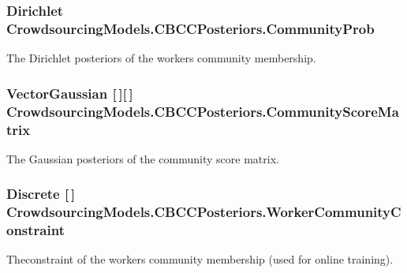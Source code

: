 \subsubsection[{Community\+Prob}]{\setlength{\rightskip}{0pt plus 5cm}Dirichlet Crowdsourcing\+Models.\+C\+B\+C\+C\+Posteriors.\+Community\+Prob}\label{class_crowdsourcing_models_1_1_c_b_c_c_posteriors_a5133c813b46dc47a1eca94f718c01560}


The Dirichlet posteriors of the workers community membership. 

\hypertarget{class_crowdsourcing_models_1_1_c_b_c_c_posteriors_ad9a3f9c06a94f221a71bfa803f4b9434}{}
\subsubsection[{Community\+Score\+Matrix}]{\setlength{\rightskip}{0pt plus 5cm}Vector\+Gaussian \mbox{[}$\,$\mbox{]}\mbox{[}$\,$\mbox{]} Crowdsourcing\+Models.\+C\+B\+C\+C\+Posteriors.\+Community\+Score\+Matrix}\label{class_crowdsourcing_models_1_1_c_b_c_c_posteriors_ad9a3f9c06a94f221a71bfa803f4b9434}


The Gaussian posteriors of the community score matrix. 

\hypertarget{class_crowdsourcing_models_1_1_c_b_c_c_posteriors_aa72e3388283ae2e52aaa15d232f38114}{}
\subsubsection[{Worker\+Community\+Constraint}]{\setlength{\rightskip}{0pt plus 5cm}Discrete \mbox{[}$\,$\mbox{]} Crowdsourcing\+Models.\+C\+B\+C\+C\+Posteriors.\+Worker\+Community\+Constraint}\label{class_crowdsourcing_models_1_1_c_b_c_c_posteriors_aa72e3388283ae2e52aaa15d232f38114}


Theconstraint of the workers community membership (used for online training). 

